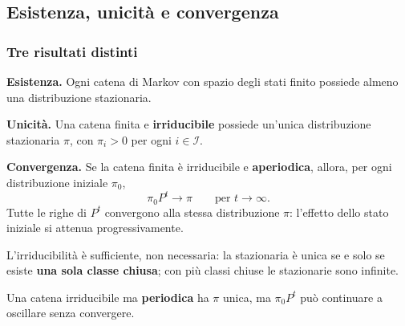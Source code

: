 

\subsection{Esistenza, unicit\`{a} e convergenza}%

\begin{frame}%
%

\frametitle{Tre risultati distinti}%
%

%


\begin{stepenumerate}
\item[1.] \textbf{Esistenza.} Ogni catena di Markov con spazio degli stati
finito possiede almeno una distribuzione stazionaria.

\item[2.] \textbf{Unicit\`{a}.} Una catena finita e \textbf{irriducibile}
possiede un'unica distribuzione stazionaria $\pi$, con $\pi_{i}>0$ per ogni
$i\in\mathcal{I}$.

\item[3.] \textbf{Convergenza.} Se la catena finita \`{e} irriducibile e
\textbf{aperiodica}, allora, per ogni distribuzione iniziale $\pi_{0}$,
\[
\pi_{0}P^{t}\longrightarrow\pi\qquad\text{per }t\longrightarrow\infty.
\]
Tutte le righe di $P^{t}$ convergono alla stessa distribuzione $\pi$:
l'effetto dello stato iniziale si attenua progressivamente.
\end{stepenumerate}

\medskip

\begin{stepitemize}


\item L'irriducibilit\`a \`e sufficiente, non necessaria: la stazionaria \`e
unica se e solo se esiste \textbf{una sola classe chiusa}; con pi\`u classi
chiuse le stazionarie sono infinite.

\item Una catena irriducibile ma \textbf{periodica} ha $\pi$ unica, ma
$\pi_{0}P^{t}$ pu\`{o} continuare a oscillare senza convergere.
\end{stepitemize}

%

\transboxout
\end{frame}%


